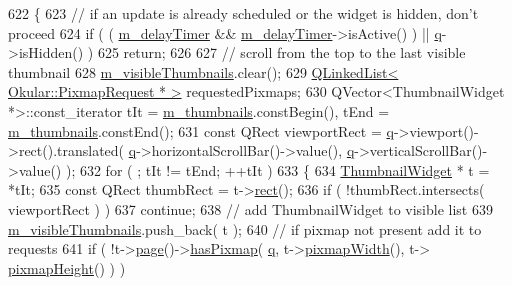 \begin{DoxyCode}
622 \{
623     \textcolor{comment}{// if an update is already scheduled or the widget is hidden, don't proceed}
624     \textcolor{keywordflow}{if} ( ( \hyperlink{classThumbnailListPrivate_a794d68d7044c33698b4b4db62d115702}{m\_delayTimer} && \hyperlink{classThumbnailListPrivate_a794d68d7044c33698b4b4db62d115702}{m\_delayTimer}->isActive() ) || 
      \hyperlink{classThumbnailListPrivate_ae2177fa339c619c575aa337d41465a4f}{q}->isHidden() )
625         \textcolor{keywordflow}{return};
626 
627     \textcolor{comment}{// scroll from the top to the last visible thumbnail}
628     \hyperlink{classThumbnailListPrivate_a7cbd0afea7a3fc032f23a1854cd7df52}{m\_visibleThumbnails}.clear();
629     \hyperlink{classQLinkedList}{QLinkedList< Okular::PixmapRequest * >} requestedPixmaps;
630     QVector<ThumbnailWidget *>::const\_iterator tIt = \hyperlink{classThumbnailListPrivate_adc3638d1cfe0435440c400065ccd20af}{m\_thumbnails}.constBegin(), tEnd = 
      \hyperlink{classThumbnailListPrivate_adc3638d1cfe0435440c400065ccd20af}{m\_thumbnails}.constEnd();
631     \textcolor{keyword}{const} QRect viewportRect = \hyperlink{classThumbnailListPrivate_ae2177fa339c619c575aa337d41465a4f}{q}->viewport()->rect().translated( \hyperlink{classThumbnailListPrivate_ae2177fa339c619c575aa337d41465a4f}{q}->horizontalScrollBar()->value(), 
      \hyperlink{classThumbnailListPrivate_ae2177fa339c619c575aa337d41465a4f}{q}->verticalScrollBar()->value() );
632     \textcolor{keywordflow}{for} ( ; tIt != tEnd; ++tIt )
633     \{
634         \hyperlink{classThumbnailWidget}{ThumbnailWidget} * t = *tIt;
635         \textcolor{keyword}{const} QRect thumbRect = t->\hyperlink{classThumbnailWidget_aacf28a07e403c56da8961af86098cbb9}{rect}();
636         \textcolor{keywordflow}{if} ( !thumbRect.intersects( viewportRect ) )
637           \textcolor{keywordflow}{continue};
638         \textcolor{comment}{// add ThumbnailWidget to visible list}
639         \hyperlink{classThumbnailListPrivate_a7cbd0afea7a3fc032f23a1854cd7df52}{m\_visibleThumbnails}.push\_back( t );
640         \textcolor{comment}{// if pixmap not present add it to requests}
641         \textcolor{keywordflow}{if} ( !t->\hyperlink{classThumbnailWidget_a3b39edbf5519ac9c804aacb79e623d5d}{page}()->\hyperlink{classOkular_1_1Page_a4c14959c8283b76513d4ba4139634575}{hasPixmap}( \hyperlink{classThumbnailListPrivate_ae2177fa339c619c575aa337d41465a4f}{q}, t->\hyperlink{classThumbnailWidget_ae3852b00d3b3bfdcbc016ab2076fce4c}{pixmapWidth}(), t->
      \hyperlink{classThumbnailWidget_a0d2a37e4299a6859e5336fb655114009}{pixmapHeight}() ) )

\end{DoxyCode}
